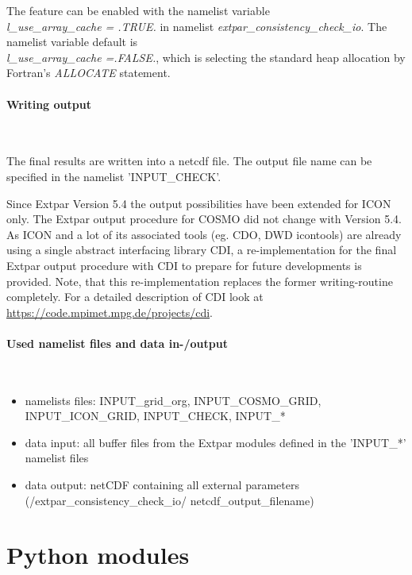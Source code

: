 \documentclass[a4paper,10pt,DIV14,BCOR1cm,titlepage,twoside]{scrartcl}
\begin{document}
\noindent The feature can be enabled with the namelist
variable \\ \textit{l\_use\_array\_cache = .TRUE.} in namelist
\textit{extpar\_consistency\_check\_io}. The namelist variable default is \\
\textit{l\_use\_array\_cache =.FALSE.}, which is selecting the standard heap allocation by
Fortran's \textit{ALLOCATE} statement.

\paragraph{Writing output}\ \par\medskip\noindent
The final results are written into a netcdf file. The output file name can be specified in the namelist 'INPUT\_CHECK'.\par\medskip\noindent
Since Extpar Version 5.4 the output possibilities have been extended for ICON only. The Extpar output procedure for COSMO did not change with Version 5.4. 
As ICON and a lot of its associated tools (eg. CDO, DWD icontools)
are already using a single abstract interfacing library CDI, a
re-implementation for the final Extpar output procedure with CDI to
prepare for future developments is provided. Note, that this re-implementation replaces the former writing-routine completely. For a detailed description of
CDI look at \\
\url{https://code.mpimet.mpg.de/projects/cdi}. 
\paragraph{Used namelist files and data in-/output}\ \par\medskip\noindent
\begin{itemize}
 \item namelists files: INPUT\_grid\_org, INPUT\_COSMO\_GRID, INPUT\_ICON\_GRID, INPUT\_CHECK, INPUT\_*
 \item data input: all buffer files from the Extpar modules defined in the 'INPUT\_*' namelist files
 \item data output: netCDF containing all external parameters (/extpar\_consistency\_check\_io/ netcdf\_output\_filename)
\end{itemize}

\clearpage

\section{Python modules}\label{Python modules}
\end{document}
